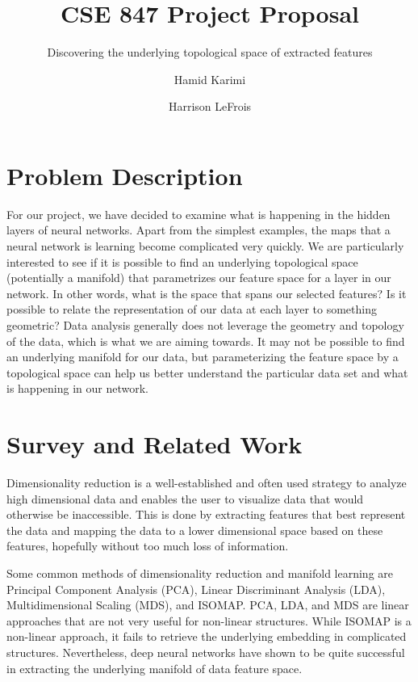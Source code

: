 \documentclass[sigconf]{acmart}
\title{CSE 847 Project Proposal}
\subtitle{Discovering the underlying topological space of extracted features}
\author{Hamid Karimi}
\affiliation{}
\author{Harrison LeFrois}
\affiliation{}
\begin{document}
	
	\maketitle
	\section{Problem Description}
	
	For our project, we have decided to examine what is happening in the hidden layers of neural networks. Apart from the simplest examples, the maps that a neural network is learning become complicated very quickly. We are particularly interested to see if it is possible to find an underlying topological space (potentially a manifold) that parametrizes our feature space for a layer in our network. In other words, what is the space that spans our selected features? Is it possible to relate the representation of our data at each layer to something geometric? Data analysis generally does not leverage the geometry and topology of the data\cite{bae}, which is what we are aiming towards. It may not be possible to find an underlying manifold for our data, but parameterizing the feature space by a topological space can help us better understand the particular data set and what is happening in our network.
	
	\section{Survey and Related Work}
	
	Dimensionality reduction is a well-established and often used strategy to analyze high dimensional data and enables the user to visualize data that would otherwise be inaccessible. This is done by extracting features that best represent the data and mapping the data to a lower dimensional space based on these features, hopefully without too much loss of information. 
	
	Some common methods of dimensionality reduction and manifold learning are Principal Component Analysis (PCA), Linear Discriminant Analysis (LDA), Multidimensional Scaling (MDS), and ISOMAP. PCA, LDA, and MDS are linear approaches that are not very useful for non-linear structures. While ISOMAP is a non-linear approach, it fails to retrieve the underlying embedding in complicated structures. Nevertheless, deep neural networks have shown to be quite successful in extracting the underlying manifold of data feature space. 
	
\end{document}
